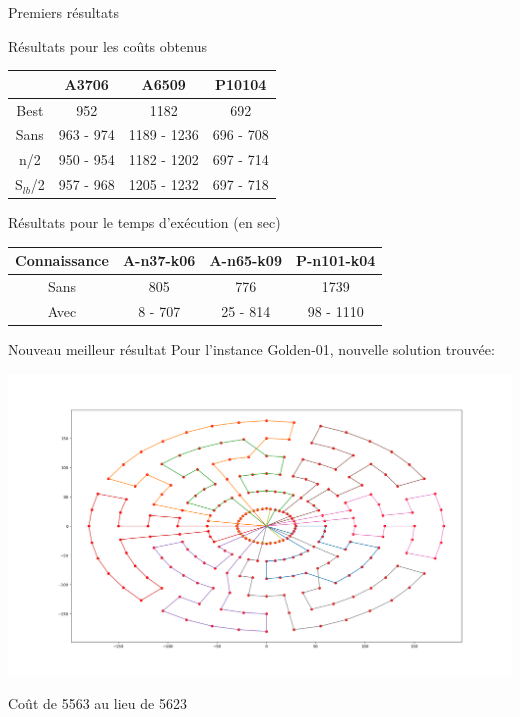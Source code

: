 \documentclass{beamer}
\begin{document}
\begin{frame}{Premiers résultats}

Résultats pour les coûts obtenus
\begin{tabular}{|c|c|c|c|}
   \hline
    & A3706 & A6509 & P10104\\
   \hline
   Best & 952 & 1182 & 692 \\
   \hline
   Sans & 963 - 974  & 1189 - 1236 & 696 - 708   \\
   \hline
   n/2 & 950 - 954 & 1182 - 1202 & 697 - 714  \\
   \hline
   S$_{lb}$/2 & 957 - 968 & 1205 - 1232 & 697 - 718 \\
   \hline
\end{tabular}

Résultats pour le temps d'exécution (en sec)
\begin{tabular}{|c|c|c|c|}
   \hline
   Connaissance  & A-n37-k06 & A-n65-k09 & P-n101-k04  \\
   \hline
   Sans & 805  & 776 &  1739  \\
   \hline
   Avec & 8 - 707  & 25 - 814 & 98 - 1110  \\
   \hline
\end{tabular}

\end{frame}

\begin{frame}{Nouveau meilleur résultat}
Pour l'instance Golden-01, nouvelle solution trouvée:


\centering
\includegraphics[scale=0.22]{NewREALbest}


Coût de 5563 au lieu de 5623
\end{frame}
\end{document}
